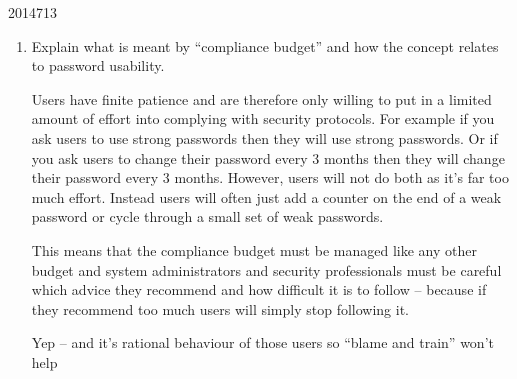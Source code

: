 \documentclass[10pt,\jkfside,a4paper]{article}
\begin{document}
\begin{enumerate}
\begin{examquestion}{2014}{7}{13}
\begin{enumerate}[label=(\alph*)]



\item Explain what is meant by ``compliance budget'' and how the concept relates to 
password usability.

Users have finite patience and are therefore only willing to put in a limited amount of effort into complying with
security protocols.
For example if you ask users to use strong passwords then they will use strong passwords. Or if you ask users to
change their password every 3 months then they will change their password every 3 months. However, users will not do
both as it's far too much effort. Instead users will often just add a counter on the end of a weak password
or cycle through a small set of weak passwords.

This means that the compliance budget must be managed like any other budget and system administrators and security
professionals must be careful which advice they recommend and how difficult it is to follow -- because if they
recommend too much users will simply stop following it.

{\color{blue}
Yep -- and it's rational behaviour of those users so ``blame and train'' won't help
}

\end{enumerate}

\end{examquestion}

\end{enumerate}
\end{document}
